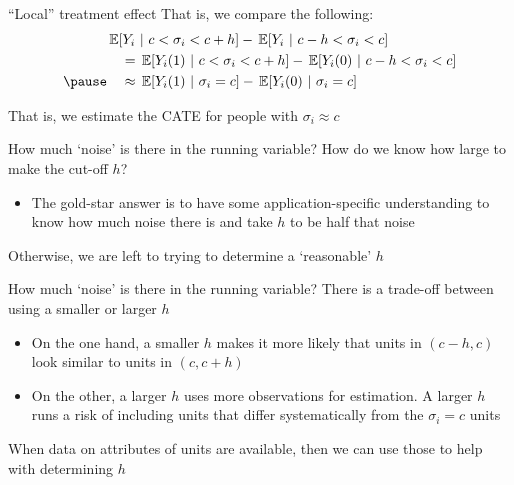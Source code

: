 \documentclass[aspectratio=169,t,11pt,table]{beamer}
\begin{document}
\begin{frame}{``Local'' treatment effect}{}
  That is, we compare the following:
  \begin{align*}
    &\expec{Y_i}{c < \sigma_i < c+h} - \expec{Y_i}{c-h < \sigma_i < c} \\
    &\quad = \expec{Y_i(1)}{c < \sigma_i < c+h} - \expec{Y_i(0)}{c-h < \sigma_i < c} \\
    \pause
    &\quad \approx \expec{Y_i(1)}{\sigma_i = c} - \expec{Y_i(0)}{\sigma_i = c}
  \end{align*}

  That is, we estimate the CATE for people with $\sigma_i \approx c$
\end{frame}

\begin{frame}{How much `noise' is there in the running variable?}{}
  How do we know how large to make the cut-off $h$? 
  \begin{itemize}
    \item The gold-star answer is to have some application-specific understanding to know how much noise there is and take $h$ to be half that noise
  \end{itemize}

  \bigskip
  Otherwise, we are left to trying to determine a `reasonable' $h$
\end{frame}

\begin{frame}{How much `noise' is there in the running variable?}{}
  There is a trade-off between using a smaller or larger $h$
  \begin{itemize}
    \item On the one hand, a smaller $h$ makes it more likely that units in $(c-h, c)$ look similar to units in $(c, c+h)$
    
    \item On the other, a larger $h$ uses more observations for estimation. A larger $h$ runs a risk of including units that differ systematically from the $\sigma_i = c$ units
  \end{itemize}

  When data on attributes of units are available, then we can use those to help with determining $h$
\end{frame}
\end{document}

